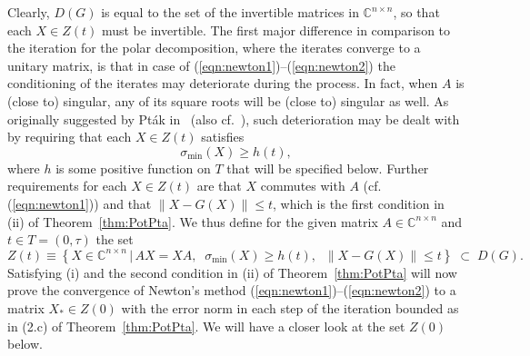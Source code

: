 \documentclass{siamltex}
\begin{document}
Clearly, $D(G)$ is equal to the set of the invertible matrices in ${\mathbb C}^{n\times n}$,
so that each $X\in Z(t)$ must be invertible.
The first major difference in comparison to the iteration for the polar decomposition,
where the iterates converge to a unitary matrix,
is that in case of (\ref{eqn:newton1})--(\ref{eqn:newton2}) the conditioning of the
iterates may deteriorate during the process. In fact, when $A$ is (close to) singular, any of
its square roots will be (close to) singular as well. As originally suggested by Pt\'ak
in~\cite{Pta76a,Pta76b} (also cf.~\cite[pp.~20--22]{PotPtaBook84}), such deterioration may be dealt
with by requiring that each $X\in Z(t)$ satisfies
$$\sigma_{\min}(X)\geq h(t),$$
where $h$ is some positive function on $T$ that will be specified below. Further requirements
for each $X\in Z(t)$ are that $X$ commutes with $A$ (cf. (\ref{eqn:newton1})) and that
$\|X-G(X)\|\leq t$, which is the first condition in (ii) of Theorem~\ref{thm:PotPta}.
We thus define for the given matrix $A\in {\mathbb C}^{n\times n}$ and $t\in T=(0,\tau)$
the set
$$Z(t) \equiv\left\{ X\in {\mathbb C}^{n\times n}\,|\, AX=XA,\;\;\sigma_{\min}(X)\geq h(t),\;\;
\|X-G(X)\|\leq t\right\}\;\subset\;D(G).$$
Satisfying (i) and the second condition in (ii) of Theorem~\ref{thm:PotPta} will now prove
the convergence of Newton's method (\ref{eqn:newton1})--(\ref{eqn:newton2}) to a matrix
$X_*\in Z(0)$ with the error norm in each step of the iteration bounded as in (2.c) of
Theorem~\ref{thm:PotPta}. We will have a closer look at the set $Z(0)$ below.
\end{document}
